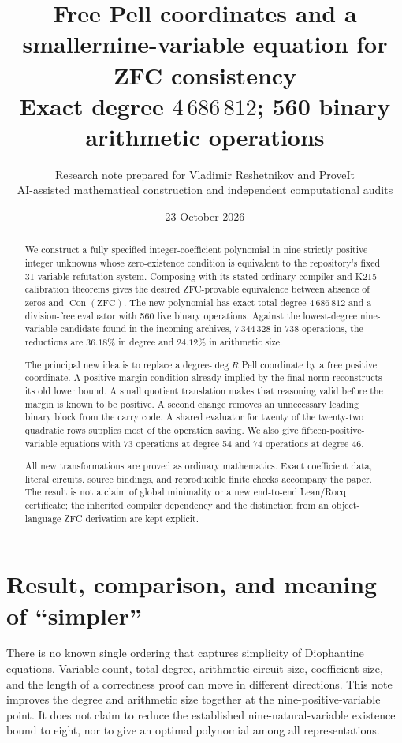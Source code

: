 \documentclass[11pt]{article}
\title{\textbf{Free Pell coordinates and a smaller\newline nine-variable equation for ZFC consistency}\\[0.6em]
\large Exact degree $4\,686\,812$; 560 binary arithmetic operations}
\author{Research note prepared for Vladimir Reshetnikov and ProveIt\\
\small AI-assisted mathematical construction and independent computational audits}
\date{23 October 2026}
\newcommand{\Con}{\operatorname{Con}}
\theoremstyle{remark}\newtheorem{remark}[theorem]{Remark}
\begin{document}
\maketitle
\begin{abstract}
We construct a fully specified integer-coefficient polynomial in nine
strictly positive integer unknowns whose zero-existence condition is
equivalent to the repository's fixed 31-variable refutation system.
Composing with its stated ordinary compiler and K215 calibration theorems
gives the desired ZFC-provable equivalence between absence of zeros and
$\Con(\mathrm{ZFC})$. The new polynomial has exact total degree
$4\,686\,812$ and a division-free evaluator with 560 live binary operations.
Against the lowest-degree nine-variable candidate found in the incoming
archives, $7\,344\,328$ in 738 operations, the reductions are
$36.18\%$ in degree and $24.12\%$ in arithmetic size.

The principal new idea is to replace a degree-$\deg R$ Pell coordinate by
a free positive coordinate. A positive-margin condition already implied
by the final norm reconstructs its old lower bound. A small quotient
translation makes that reasoning valid before the margin is known to be
positive. A second change removes an unnecessary leading binary block
from the carry code. A shared evaluator for twenty of the twenty-two
quadratic rows supplies most of the operation saving. We also give
fifteen-positive-variable equations with 73 operations at degree 54 and
74 operations at degree 46.

All new transformations are proved as ordinary mathematics. Exact
coefficient data, literal circuits, source bindings, and reproducible
finite checks accompany the paper. The result is not a claim of global
minimality or a new end-to-end Lean/Rocq certificate; the inherited
compiler dependency and the distinction from an object-language ZFC
derivation are kept explicit.
\end{abstract}
\newpage
\tableofcontents
\newpage

\section{Result, comparison, and meaning of ``simpler''}

There is no known single ordering that captures simplicity of Diophantine
equations. Variable count, total degree, arithmetic circuit size, coefficient
size, and the length of a correctness proof can move in different directions.
This note improves the degree and arithmetic size together at the
nine-positive-variable point. It does not claim to reduce the established
nine-natural-variable existence bound to eight, nor to give an optimal
polynomial among all representations.
\end{document}
